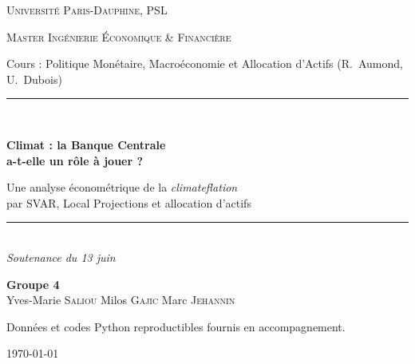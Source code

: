 \documentclass[11pt,a4paper]{article}
\begin{document}
\begin{titlepage}
\centering
\vspace*{1.4cm}
{\small\textsc{Université Paris-Dauphine, PSL}\par}
{\small\textsc{Master Ingénierie Économique \& Financière}\par}
{\small Cours : Politique Monétaire, Macroéconomie et Allocation d'Actifs (R.~Aumond, U.~Dubois)\par}
\vspace{2.0cm}
\rule{\linewidth}{0.4pt}\\[0.5cm]
{\LARGE\bfseries\color{dauphblue} Climat : la Banque Centrale\\[0.2cm] a-t-elle un rôle à jouer ?\par}
\vspace{0.5cm}
{\large Une analyse économétrique de la \emph{climateflation}\\
par SVAR, Local Projections et allocation d'actifs\par}
\rule{\linewidth}{0.4pt}\\[1.4cm]
{\large\itshape Soutenance du 13 juin}\par
\vspace{2.2cm}
\begin{minipage}{0.9\textwidth}\centering
\textbf{Groupe 4}\\[0.3cm]
Yves-Marie \textsc{Saliou} \quad\textperiodcentered\quad Milos \textsc{Gajic} \quad\textperiodcentered\quad Marc \textsc{Jehannin}
\end{minipage}
\vfill
{\small Données et codes Python reproductibles fournis en accompagnement.\par}
{\small \today\par}
\end{titlepage}

\end{document}
